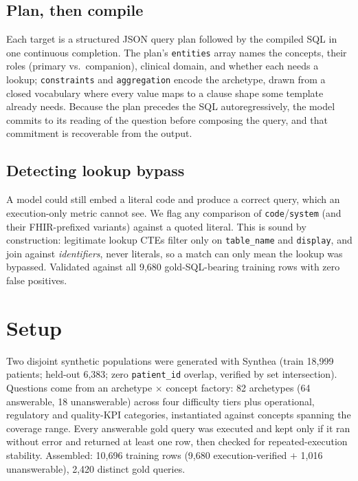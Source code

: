 \documentclass[pmlr,twocolumn,10pt]{jmlr} %
\begin{document}
\subsection{Plan, then compile}

Each target is a structured JSON query plan followed by the compiled SQL in one
continuous completion. The plan's \texttt{entities} array names the concepts,
their roles (primary vs.\ companion), clinical domain, and whether each needs a
lookup; \texttt{constraints} and \texttt{aggregation} encode the archetype, drawn
from a closed vocabulary where every value maps to a clause shape some template
already needs. Because the plan precedes the SQL autoregressively, the model
commits to its reading of the question before composing the query, and that
commitment is recoverable from the output.

\subsection{Detecting lookup bypass}

A model could still embed a literal code and produce a correct query, which an
execution-only metric cannot see. We flag any comparison of
\texttt{code}/\texttt{system} (and their FHIR-prefixed variants) against a quoted
literal. This is sound by construction: legitimate lookup CTEs filter only on
\texttt{table\_name} and \texttt{display}, and join against \emph{identifiers},
never literals, so a match can only mean the lookup was bypassed. Validated
against all 9,680 gold-SQL-bearing training rows with zero false positives.

\section{Setup}

Two disjoint synthetic populations were generated with Synthea
\citep{walonoski2018synthea} (train 18,999 patients; held-out 6,383; zero
\texttt{patient\_id} overlap, verified by set intersection). Questions come from
an archetype $\times$ concept factory: 82 archetypes (64 answerable, 18
unanswerable) across four difficulty tiers plus operational, regulatory and
quality-KPI categories, instantiated against concepts spanning the coverage
range. Every answerable gold query was executed and kept only if it ran without
error and returned at least one row, then checked for repeated-execution
stability. Assembled: 10,696 training rows (9,680 execution-verified $+$ 1,016
unanswerable), 2,420 distinct gold queries.
\end{document}
